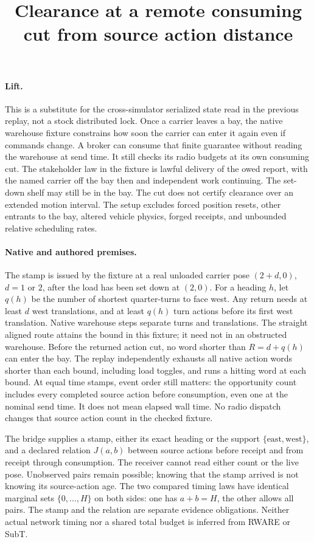 \documentclass{article}
\title{Clearance at a remote consuming cut from source action distance}
\begin{document}
\maketitle

\paragraph{Lift.}
This is a substitute for the cross-simulator serialized state read in the
previous replay, not a stock distributed lock. Once a carrier leaves a bay,
the native warehouse fixture constrains how soon the carrier can enter it
again even if commands change. A broker can consume that finite guarantee
without reading the warehouse at send time. It still checks its radio
budgets at its own consuming cut. The stakeholder law in the fixture is
lawful delivery of the owed report, with the named carrier off the bay then and independent
work continuing. The set-down shelf may still be in the bay. The cut does not certify
clearance over an extended
motion interval. The setup excludes forced position resets, other entrants
to the bay, altered vehicle physics, forged receipts, and unbounded
relative scheduling rates.

\paragraph{Native and authored premises.}
The stamp is issued by the fixture at a real unloaded carrier pose
$(2+d,0)$, $d=1$ or $2$, after the load has been set down at $(2,0)$.
For a heading $h$, let $q(h)$ be the number of shortest quarter-turns
to face west. Any return needs at least $d$ west translations, and at
least $q(h)$ turn actions before its first west translation. Native
warehouse steps separate turns and translations. The straight aligned
route attains the bound in this fixture; it need not in an obstructed
warehouse. Before the returned action cut, no word shorter than
$R=d+q(h)$ can enter the bay. The replay independently exhausts all
native action words shorter than each bound, including load toggles, and
runs a hitting word at each bound. At equal time stamps, event order
still matters: the opportunity count includes every completed source
action before consumption, even one at the nominal send time. It does
not mean elapsed wall time. No radio dispatch changes that source
action count in the checked fixture.

The bridge supplies a stamp, either its exact heading or the support
$\{\text{east},\text{west}\}$, and a declared relation $J(a,b)$ between
source actions before receipt and from receipt through consumption.
The receiver cannot read either count or the live pose. Unobserved pairs
remain possible; knowing that the stamp arrived is not knowing its
source-action age. The two compared timing laws have identical marginal
sets $\{0,\ldots,H\}$ on both sides: one has $a+b=H$, the other allows
all pairs. The stamp and the relation are separate evidence obligations.
Neither actual network timing nor a shared total budget is inferred from
RWARE or SubT.
\end{document}
